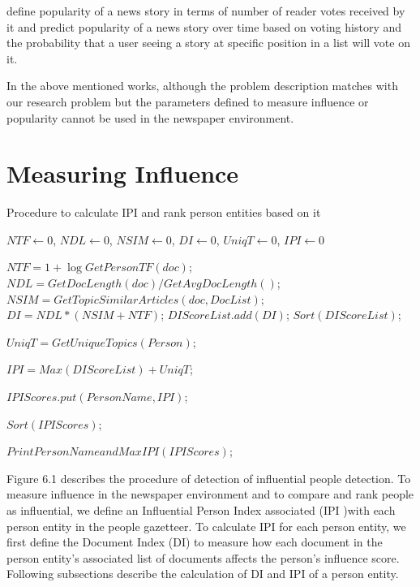 \cite{lerman2010using} define popularity of a news story in terms of number of reader votes received by it and predict popularity of a news story over time based on voting history and the probability that a user seeing a story at specific position in a list will vote on it. 


\cite{watts2007influentials}
In the above mentioned works, although the problem description matches with our research problem but the parameters defined to measure influence or popularity cannot be used in the newspaper environment. 


\section{Measuring Influence}
\label{influential:measure}

\begin{algorithm}[!htb]
\caption{Procedure to calculate IPI and rank person entities based on it}
\begin{algorithmic}
  


   $NTF \leftarrow $0,  $NDL \leftarrow $0, $NSIM \leftarrow $0, $DI\leftarrow $0, $UniqT\leftarrow $0, $IPI\leftarrow $0\;  
  {
     {
	{	
		$NTF=1+\log GetPersonTF(doc)$;
		$NDL=GetDocLength(doc)/GetAvgDocLength()$;
		$ NSIM=GetTopicSimilarArticles(doc,DocList)$;
		$DI=NDL*(NSIM+NTF)$;
		$DIScoreList.add(DI)$;
 	 }
		$Sort(DIScoreList)$;

		$UniqT=GetUniqueTopics(Person)$;

		$IPI=Max(DIScoreList)+UniqT$;

		$IPIScores.put(PersonName,IPI)$;
       }
	$Sort(IPIScores)$;

	$PrintPersonNameandMaxIPI(IPIScores)$;
}
	 
\EndFunction
\end{algorithmic}
\end{algorithm}





 Figure 6.1 describes the procedure of detection of influential people detection. To measure influence in the newspaper environment and to compare and rank people as influential, we define an Influential Person Index associated (IPI )with each person entity in the people gazetteer. To calculate IPI for each person entity, we first define the Document Index (DI) to measure how each document in the person entity's associated list of documents affects the person's influence score.
Following subsections describe the calculation of DI and IPI of a person entity.

